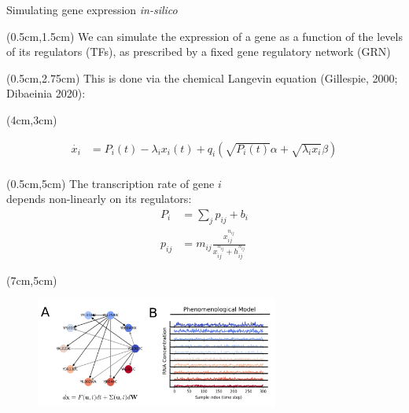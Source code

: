 \documentclass[aspectratio=1610]{beamer}					%
\begin{document}
\begin{frame}{Simulating gene expression \emph{in-silico}}

\begin{textblock*}{15cm}(0.5cm,1.5cm)
We can simulate the expression of a gene as a function of the levels of its regulators (TFs), as prescribed by a
fixed gene regulatory network (GRN) 
\end{textblock*}

\begin{textblock*}{15cm}(0.5cm,2.75cm)
This is done via the chemical Langevin equation (Gillespie, 2000; Dibaeinia 2020):
\end{textblock*}

\begin{textblock*}{7cm}(4cm,3cm)
\begin{figure}
\begin{align*}
\dot{x_{i}} &= P_{i}(t) -\lambda_{i}x_{i}(t) + q_{i}\left(\sqrt{P_{i}(t)}\alpha + \sqrt{\lambda_{i}x_{i}}\beta\right)  \\
\end{align*}
\end{figure}
\end{textblock*}

\begin{textblock*}{7cm}(0.5cm,5cm)
The transcription rate of gene $i$\\
depends non-linearly on its regulators:
\begin{align*}
P_{i} &= \sum_{j}p_{ij} + b_{i}\\
p_{ij} &= m_{ij}\frac{x_{ij}^{n_{ij}}}{x_{ij}^{n_{ij}}+h_{ij}^{n_{ij}}}
\end{align*}
\end{textblock*}

\begin{textblock*}{8cm}(7cm,5cm)
\begin{figure}
\includegraphics[width=8cm]{logic-ab.png}
\end{figure}
\end{textblock*}

\end{frame}
\end{document}
